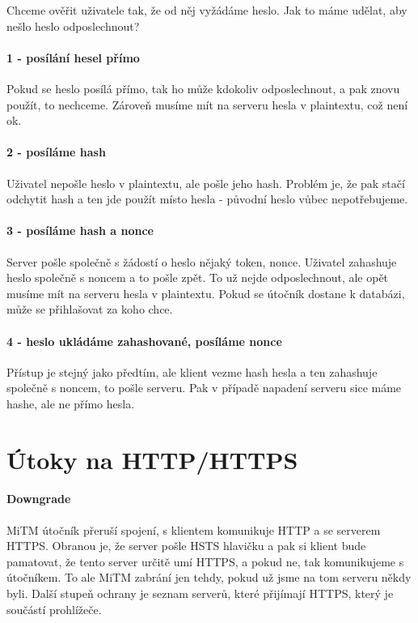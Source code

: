 Chceme ověřit uživatele tak, že od něj vyžádáme heslo. Jak to máme udělat, aby nešlo heslo odposlechnout?

\paragraph{1 - posílání hesel přímo} Pokud se heslo posílá přímo, tak ho může kdokoliv odposlechnout, a pak znovu použít, to nechceme. Zároveň musíme mít na serveru hesla v plaintextu, což není ok.

\paragraph{2 - posíláme hash} Uživatel nepošle heslo v plaintextu, ale pošle jeho hash. Problém je, že pak stačí odchytit hash a ten jde použít místo hesla - původní heslo vůbec nepotřebujeme.

\paragraph{3 - posíláme hash a nonce} Server pošle společně s žádostí o heslo nějaký token, nonce. Uživatel zahashuje heslo společně s noncem a to pošle zpět. To už nejde odposlechnout, ale opět musíme mít na serveru hesla v plaintextu. Pokud se útočník dostane k databázi, může se přihlašovat za koho chce.

\paragraph{4 - heslo ukládáme zahashované, posíláme nonce} Přístup je stejný jako předtím, ale klient vezme hash hesla a ten zahashuje společně s noncem, to pošle serveru. Pak v případě napadení serveru sice máme hashe, ale ne přímo hesla.




\section{Útoky na HTTP/HTTPS}

\paragraph{Downgrade} MiTM útočník přeruší spojení, s klientem komunikuje HTTP a se serverem HTTPS. Obranou je, že server pošle HSTS hlavičku a pak si klient bude pamatovat, že tento server určitě umí HTTPS, a pokud ne, tak komunikujeme s útočníkem. To ale MiTM zabrání jen tehdy, pokud už jsme na tom serveru někdy byli. Další stupeň ochrany je seznam serverů, které přijímají HTTPS, který je součástí prohlížeče.

